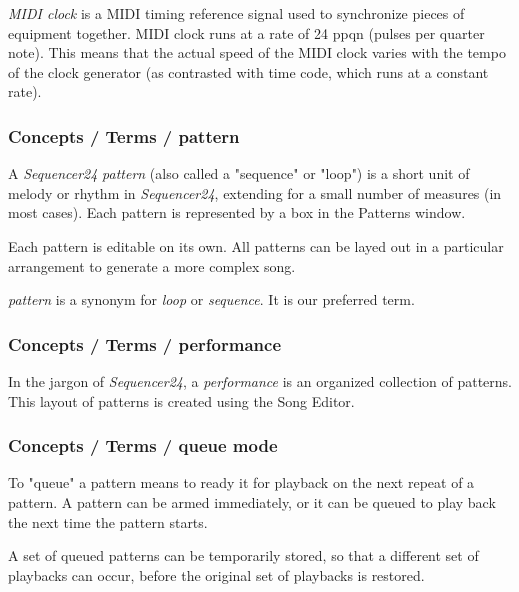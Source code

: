    \textsl{MIDI clock} is
   a MIDI timing reference signal used to synchronize pieces of equipment
   together. MIDI clock runs at a rate of 24 ppqn (pulses per quarter note).
   This means that the actual speed of the MIDI clock varies with the tempo
   of the clock generator (as contrasted with time code, which runs at a
   constant rate).

\subsubsection{Concepts / Terms / pattern}
\label{subsubsec:concepts_terms_pattern}

   A \textsl{Sequencer24} \textsl{pattern}
   (also called a "sequence" or "loop")
   is a short unit of melody or rhythm in \textsl{Sequencer24},
   extending for a small number of measures (in most cases).
   Each pattern is represented by a box in the Patterns window.

   Each pattern is editable on its own.  All patterns can be layed out in
   a particular arrangement to generate a more complex song.

   \textsl{pattern} is a synonym for \textsl{loop} or \textsl{sequence}.
   It is our preferred term.

\subsubsection{Concepts / Terms / performance}
\label{subsubsec:concepts_terms_performance}

   In the jargon of \textsl{Sequencer24}, a
   \textsl{performance} is an organized collection of patterns.
   This layout of patterns is created using the Song Editor.

\subsubsection{Concepts / Terms / queue mode}
\label{subsubsec:concepts_terms_queue_mode}

   To "queue" a pattern means to ready it for playback on the next repeat of
   a pattern.  A pattern can be armed immediately, or it can be queued to
   play back the next time the pattern starts.

   A set of queued patterns can be temporarily stored, so that a different
   set of playbacks can occur, before the original set of playbacks is
   restored.

